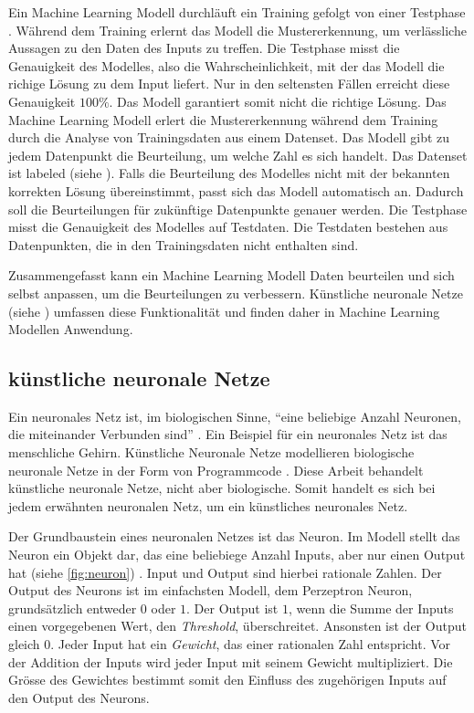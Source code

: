 Ein Machine Learning Modell durchläuft ein Training gefolgt von einer Testphase
\cite{noauthor_training_nodate}. Während dem Training erlernt das Modell die
Mustererkennung, um verlässliche Aussagen zu den Daten des Inputs zu treffen.
Die Testphase misst die Genauigkeit des Modelles, also die Wahrscheinlichkeit,
mit der das Modell die richige Lösung zu dem Input liefert. Nur in den seltensten
Fällen erreicht diese Genauigkeit $100\%$. Das Modell garantiert somit nicht die
richtige Lösung. Das Machine Learning Modell erlert die Mustererkennung während
dem Training durch die Analyse von Trainingsdaten aus einem Datenset. Das Modell
gibt zu jedem Datenpunkt die Beurteilung, um welche Zahl es sich handelt. Das
Datenset ist labeled (siehe ). Falls die Beurteilung des
Modelles nicht mit der bekannten korrekten Lösung übereinstimmt, passt sich das
Modell automatisch an. Dadurch soll die Beurteilungen für zukünftige Datenpunkte
genauer werden. Die Testphase misst die Genauigkeit des Modelles auf Testdaten.
Die Testdaten bestehen aus Datenpunkten, die in den Trainingsdaten nicht
enthalten sind.

Zusammengefasst kann ein Machine Learning Modell Daten beurteilen und sich
selbst anpassen, um die Beurteilungen zu verbessern. Künstliche neuronale Netze
(siehe ) umfassen diese Funktionalität und finden daher in
Machine Learning Modellen Anwendung.

\subsection{künstliche neuronale Netze}\label{sub:t_ml_nn} Ein neuronales Netz
ist, im biologischen Sinne, ``eine beliebige Anzahl Neuronen, die miteinander
Verbunden sind'' \cite{noauthor_neuronales_2021}. Ein Beispiel für ein neuronales
Netz ist das menschliche Gehirn. Künstliche Neuronale Netze modellieren
biologische neuronale Netze in der Form von Programmcode
\cite{noauthor_artificial_nodate}. Diese Arbeit behandelt künstliche neuronale
Netze, nicht aber biologische. Somit handelt es sich bei jedem erwähnten
neuronalen Netz, um ein künstliches neuronales Netz.

Der Grundbaustein eines neuronalen Netzes ist das Neuron. Im Modell stellt das
Neuron ein Objekt dar, das eine beliebiege Anzahl Inputs, aber nur einen Output
hat (siehe \autoref{fig:neuron}) \cite{pramoditha_concept_2021}. Input und
Output sind hierbei rationale Zahlen. Der Output des Neurons ist im einfachsten
Modell, dem Perzeptron Neuron, grundsätzlich entweder $0$ oder $1$. Der Output ist
$1$, wenn die Summe der Inputs einen vorgegebenen Wert, den \emph{Threshold},
überschreitet. Ansonsten ist der Output gleich $0$. Jeder Input hat ein
\emph{Gewicht}, das einer rationalen Zahl entspricht. Vor der Addition der
Inputs wird jeder Input mit seinem Gewicht multipliziert. Die Grösse des
Gewichtes bestimmt somit den Einfluss des zugehörigen Inputs auf den Output des
Neurons. \cite{nielsen_neural_2015}\cite{simplilearn_what_2021}

